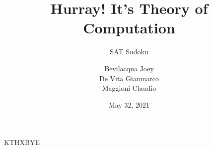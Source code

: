 \documentclass[t,aspectratio=1610]{beamer}
\title{Hurray! It's Theory of Computation}
\subtitle{\Large{SAT Sudoku}}
\author{Bevilacqua Joey \\ De Vita Gianmarco \\ Maggioni Claudio}
\institute{Universit\`a della Svizzera Italiana\\ Faculty of Informatics\\ \url{www.unisi.ch}}
\date{May 32, 2021}
\begin{document}
{
%
\begin{frame}
\maketitle
\end{frame}
}

\begin{frame}
KTHXBYE
\end{frame}

{
\begin{frame}
\end{frame}
}
\end{document}
